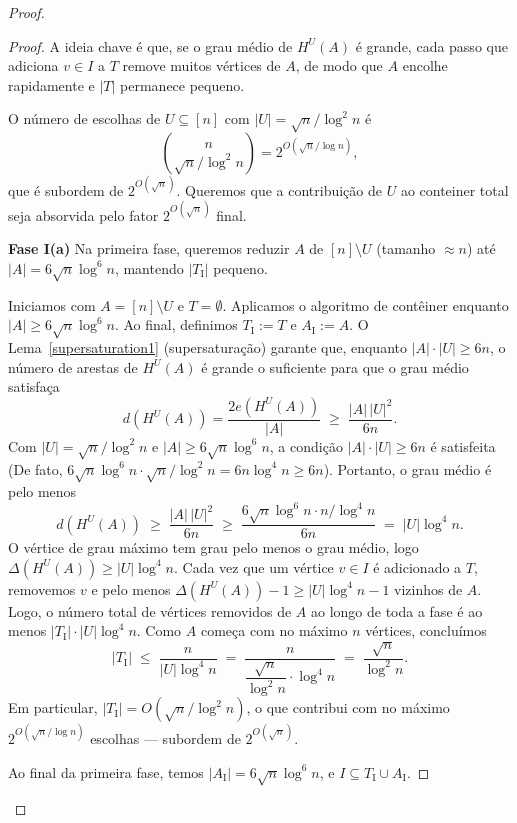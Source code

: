 \documentclass[reqno,a4paper,12pt]{amsart}
\begin{document}
\begin{proof}
\begin{proof}
    A ideia chave é que, se o grau médio de $H^U(A)$ é grande, cada passo que adiciona $v \in I$ a $T$
    remove muitos vértices de $A$, de modo que $A$ encolhe rapidamente e $|T|$ permanece pequeno.

    O número de escolhas de $U \subseteq [n]$ com $|U| = \sqrt{n}/\log^2 n$ é
    \[
      \binom{n}{\sqrt{n}/\log^2 n} = 2^{O(\sqrt{n}/\log n)},
    \]
    que é subordem de $2^{O(\sqrt{n})}$. Queremos que a contribuição de $U$ ao conteiner total seja
    absorvida pelo fator $2^{O(\sqrt{n})}$ final.

    \bigskip

    \textbf{Fase I(a)}
    Na primeira fase, queremos reduzir $A$ de $[n] \setminus U$ (tamanho $\approx n$) até $|A| = 6\sqrt{n}\log^6 n$,
    mantendo $|T_{\mathrm{I}}|$ pequeno.

    Iniciamos com $A = [n] \setminus U$ e $T = \emptyset$. Aplicamos o algoritmo de
    contêiner enquanto $|A| \geq 6\sqrt{n}\log^6 n$. Ao final, definimos $T_{\mathrm{I}} := T$ e
    $A_{\mathrm{I}} := A$.
    O Lema~\ref{supersaturation1} (supersaturação) garante que, enquanto $|A| \cdot |U| \geq 6n$, o número de arestas de
    $H^U(A)$ é grande o suficiente para que o grau médio satisfaça
    \[
      d(H^U(A)) = \frac{2e(H^U(A))}{|A|} \;\geq\; \frac{|A|\,|U|^2}{6n}.
    \]
    Com $|U| = \sqrt{n}/\log^2 n$ e $|A| \geq 6\sqrt{n}\log^6 n$, a condição $|A| \cdot |U| \geq 6n$ é
    satisfeita (De fato, $6\sqrt{n}\log^6 n \cdot \sqrt{n}/\log^2 n = 6n\log^4 n \geq 6n$).
    Portanto, o grau médio é pelo menos
    \[
      d(H^U(A)) \;\geq\; \frac{|A|\,|U|^2}{6n} \;\geq\; \frac{6\sqrt{n}\log^6 n \cdot n/\log^4 n}{6n}
      \;=\; |U|\log^4 n.
    \]
    O vértice de grau máximo tem grau pelo menos o grau médio, logo $\Delta(H^U(A)) \geq |U|\log^4 n$.
    Cada vez que um vértice $v \in I$ é adicionado a $T$, removemos $v$ e pelo menos $\Delta(H^U(A)) - 1
      \geq |U|\log^4 n - 1$ vizinhos de $A$. Logo, o número total de vértices removidos de $A$ ao longo
    de toda a fase é ao menos $|T_{\mathrm{I}}| \cdot |U|\log^4 n$. Como $A$ começa com no máximo $n$
    vértices, concluímos
    \[
      |T_{\mathrm{I}}| \;\leq\; \frac{n}{|U|\log^4 n}
      \;=\; \frac{n}{\dfrac{\sqrt{n}}{\log^2 n} \cdot \log^4 n}
      \;=\; \frac{\sqrt{n}}{\log^2 n}.
    \]
    Em particular, $|T_{\mathrm{I}}| = O\!\left(\sqrt{n}/\log^2 n\right)$, o que contribui com no
    máximo $2^{O(\sqrt{n}/\log n)}$ escolhas — subordem de $2^{O(\sqrt{n})}$.


    Ao final da primeira fase, temos $|A_{\mathrm{I}}| = 6\sqrt{n}\log^6 n$, e $I \subseteq T_{\mathrm{I}} \cup A_{\mathrm{I}}$.



\end{proof}
\end{proof}
\end{document}
